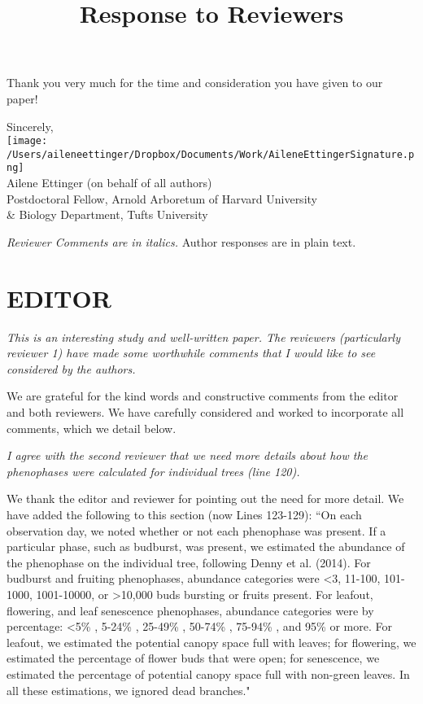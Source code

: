 \documentclass[10.95pt,a4paper]{letter}
\begin{document}
\begin{letter}{}
Thank you very much for the time and consideration you have given to our paper!

Sincerely,\\

\texttt{[image: /Users/aileneettinger/Dropbox/Documents/Work/AileneEttingerSignature.png]} \\
Ailene Ettinger (on behalf of all authors)\\
Postdoctoral Fellow, Arnold Arboretum of Harvard University \\ \& Biology Department, Tufts University

\end{letter}
\clearpage

\title{Response to Reviewers}
 \emph{Reviewer Comments are in italics.} Author responses are in plain text.

\section {EDITOR}
\par \emph{This is an interesting study and well-written paper.  The reviewers (particularly reviewer 1) have made some worthwhile comments that I would like to see considered by the authors.}
\par We are grateful for the kind words and constructive comments from the editor and both reviewers. We have carefully considered and worked to incorporate all comments, which we detail below.

\par \emph{I agree with the second reviewer that we need more details about how the phenophases were calculated for individual trees (line 120). }
\par We thank the editor and reviewer for pointing out the need for more detail. We have added the following to this section (now Lines 123-129): 
``On each observation day, we noted whether or not each phenophase was present. If a particular phase, such as budburst, was present, we estimated the abundance of the phenophase on the individual tree, following Denny et al. (2014). For budburst and fruiting phenophases, abundance categories were \textless 3, 11-100, 101-1000, 1001-10000, or \textgreater10,000 buds bursting or fruits present. For leafout, flowering, and leaf senescence phenophases, abundance categories were by percentage: \textless 5\% , 5-24\% , 25-49\% , 50-74\% , 75-94\% , and 95\%  or more. For leafout, we estimated the potential canopy space full with leaves; for flowering, we estimated the percentage of flower buds that were open; for senescence, we estimated the percentage of potential canopy space full with non-green leaves. In all these estimations, we ignored dead branches." 
\end{document}
